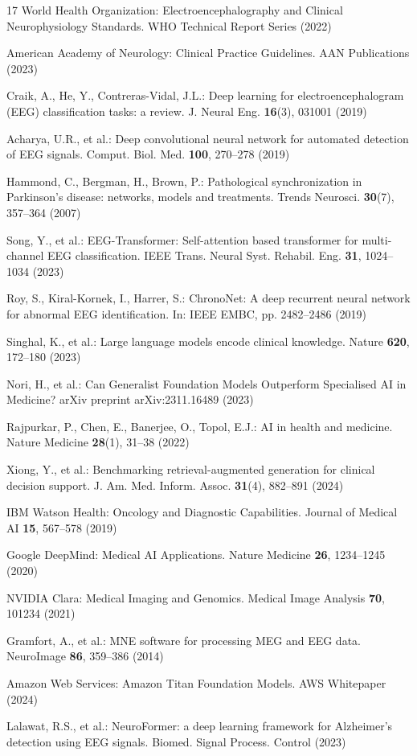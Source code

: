 \documentclass[runningheads]{llncs}
\begin{document}
\begin{thebibliography}{17}
World Health Organization: Electroencephalography and Clinical Neurophysiology Standards. WHO Technical Report Series (2022)

American Academy of Neurology: Clinical Practice Guidelines. AAN Publications (2023)

Craik, A., He, Y., Contreras-Vidal, J.L.: Deep learning for electroencephalogram (EEG) classification tasks: a review. J. Neural Eng. \textbf{16}(3), 031001 (2019)

Acharya, U.R., et al.: Deep convolutional neural network for automated detection of EEG signals. Comput. Biol. Med. \textbf{100}, 270--278 (2019)

Hammond, C., Bergman, H., Brown, P.: Pathological synchronization in Parkinson's disease: networks, models and treatments. Trends Neurosci. \textbf{30}(7), 357--364 (2007)

Song, Y., et al.: EEG-Transformer: Self-attention based transformer for multi-channel EEG classification. IEEE Trans. Neural Syst. Rehabil. Eng. \textbf{31}, 1024--1034 (2023)

Roy, S., Kiral-Kornek, I., Harrer, S.: ChronoNet: A deep recurrent neural network for abnormal EEG identification. In: IEEE EMBC, pp. 2482--2486 (2019)

Singhal, K., et al.: Large language models encode clinical knowledge. Nature \textbf{620}, 172--180 (2023)

Nori, H., et al.: Can Generalist Foundation Models Outperform Specialised AI in Medicine? arXiv preprint arXiv:2311.16489 (2023)

Rajpurkar, P., Chen, E., Banerjee, O., Topol, E.J.: AI in health and medicine. Nature Medicine \textbf{28}(1), 31--38 (2022)

Xiong, Y., et al.: Benchmarking retrieval-augmented generation for clinical decision support. J. Am. Med. Inform. Assoc. \textbf{31}(4), 882--891 (2024)

IBM Watson Health: Oncology and Diagnostic Capabilities. Journal of Medical AI \textbf{15}, 567--578 (2019)

Google DeepMind: Medical AI Applications. Nature Medicine \textbf{26}, 1234--1245 (2020)

NVIDIA Clara: Medical Imaging and Genomics. Medical Image Analysis \textbf{70}, 101234 (2021)

Gramfort, A., et al.: MNE software for processing MEG and EEG data. NeuroImage \textbf{86}, 359--386 (2014)

Amazon Web Services: Amazon Titan Foundation Models. AWS Whitepaper (2024)

Lalawat, R.S., et al.: NeuroFormer: a deep learning framework for Alzheimer's detection using EEG signals. Biomed. Signal Process. Control (2023)
\end{thebibliography}
\end{document}

